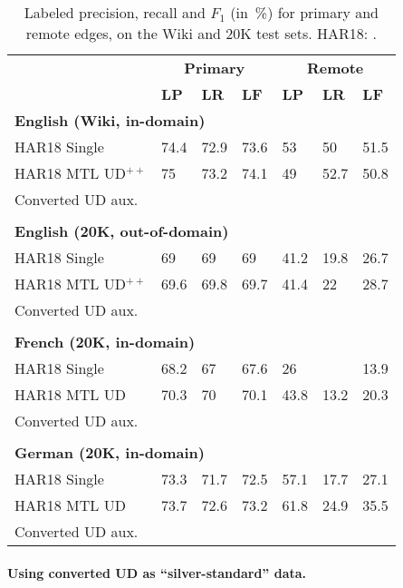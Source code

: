 \documentclass[11pt,a4paper]{article}
\begin{document}
\begin{table}[t]
\centering
\small
\setlength\tabcolsep{3pt}
\begin{tabular}{l|lll|lll}
& \multicolumn{3}{c|}{\footnotesize \bf Primary} & \multicolumn{3}{c}{\footnotesize \bf Remote} \\
& \footnotesize \textbf{LP} & \footnotesize \textbf{LR} & \footnotesize \textbf{LF}
& \footnotesize \textbf{LP} & \footnotesize \textbf{LR} & \footnotesize \textbf{LF} \\
\hline
\multicolumn{4}{l|}{\small \bf English (Wiki, in-domain)} & \\
\footnotesize HAR18 Single
& 74.4 & 72.9 & 73.6 & 53 & 50 & 51.5 \\
\footnotesize HAR18 MTL UD$^{++}$
& 75 & 73.2 & 74.1 & 49 & 52.7 & 50.8 \\
\footnotesize Converted UD aux.
\\
\hline\\
\multicolumn{4}{l|}{\small \bf English (20K, out-of-domain)} & \\
\footnotesize HAR18 Single
& 69 & 69 & 69 & 41.2 & 19.8 & 26.7 \\
\footnotesize HAR18 MTL UD$^{++}$
& 69.6 & 69.8 & 69.7 & 41.4 & 22 & 28.7 \\
\footnotesize Converted UD aux.
\\
\hline\\
\multicolumn{4}{l|}{\small \bf French (20K, in-domain)} & \\
\small HAR18 Single & 68.2 & 67 & 67.6 & 26 & \enskip 9.4 & 13.9 \\
\small HAR18 MTL UD & 70.3 & 70 & 70.1 & 43.8 & 13.2 & 20.3 \\
\footnotesize Converted UD aux.
\\
\hline\\
\multicolumn{4}{l|}{\small \bf German (20K, in-domain)} & \\
\small HAR18 Single & 73.3 & 71.7 & 72.5 & 57.1 & 17.7 & 27.1 \\
\small HAR18 MTL UD & 73.7 & 72.6 & 73.2 & 61.8 & 24.9 & 35.5 \\
\footnotesize Converted UD aux.
\\
\end{tabular}
\caption{
Labeled precision, recall and $F_1$ (in~\%) for primary and remote edges,
on the Wiki and 20K test sets.
HAR18: \protect{}.}\label{tab:aux_results}
\end{table}

\paragraph{Using converted UD as ``silver-standard'' data.}
\end{document}
